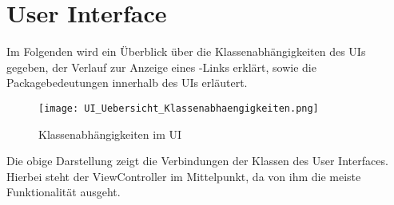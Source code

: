 
\chapter{User Interface}

Im Folgenden wird ein Überblick über die Klassenabhängigkeiten des UIs gegeben, der Verlauf zur Anzeige eines \SEARCH-Links erklärt, sowie die Packagebedeutungen innerhalb des UIs erläutert.

\begin{figure}[h]
	\centering
	\texttt{[image: UI\_Uebersicht\_Klassenabhaengigkeiten.png]}
	\caption{Klassenabhängigkeiten im UI}
	\label{fig:Klassenabhängigkeiten}
\end{figure}

Die obige Darstellung zeigt die Verbindungen der Klassen des User Interfaces. Hierbei steht der ViewController im Mittelpunkt, da von ihm die meiste Funktionalität ausgeht.


\newpage

\newpage

\newpage

\newpage

\newpage


